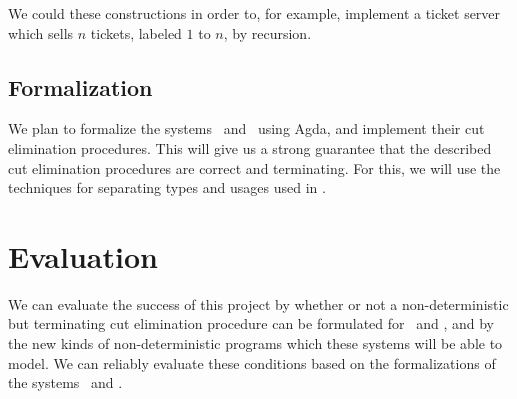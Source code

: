 \documentclass[twocolumn]{article}
\begin{document}
We could these constructions in order to, for example, implement a ticket server
which sells $n$ tickets, labeled $1$ to $n$, by recursion.

\subsection{Formalization}
We plan to formalize the systems \gtcp\ and \ndcp\ using Agda, and implement
their cut elimination procedures.
This will give us a strong guarantee that the described cut elimination
procedures are correct and terminating.
For this, we will use the techniques for separating types and usages used in
\citet{mcbride2016}.



\section{Evaluation}
We can evaluate the success of this project by whether or not a
non-deterministic but terminating cut elimination procedure can be formulated
for \gtcp\ and \ndcp, and by the new kinds of non-deterministic programs which
these systems will be able to model.
We can reliably evaluate these conditions based on the formalizations of the
systems \gtcp\ and \ndcp.

\end{document}
